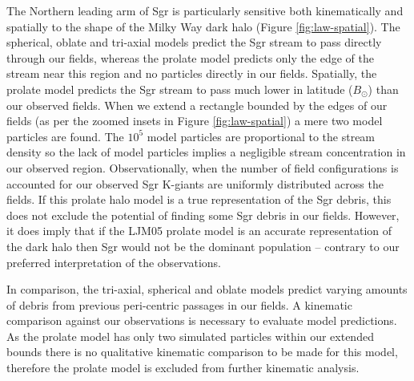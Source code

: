 \documentclass[preprint2]{aastex}
\begin{document}
	The Northern leading arm of Sgr is particularly sensitive both kinematically and spatially to the shape of the Milky Way dark halo (Figure \ref{fig:law-spatial}). The spherical, oblate and tri-axial models predict the Sgr stream to pass directly through our fields, whereas the prolate model predicts only the edge of the stream near this region and no particles directly in our fields. Spatially, the prolate model predicts the Sgr stream to pass much lower in latitude ($B_\odot$) than our observed fields. When we extend a rectangle bounded by the edges of our fields (as per the zoomed insets in Figure \ref{fig:law-spatial}) a mere two model particles are found. The $10^5$ model particles are proportional to the stream density so the lack of model particles implies a negligible stream concentration in our observed region. Observationally, when the number of field configurations is accounted for our observed Sgr K-giants are uniformly distributed across the fields. If this prolate halo model is a true representation of the Sgr debris, this does not exclude the potential of finding some Sgr debris in our fields. However, it does imply that if the LJM05 prolate model is an accurate representation of the dark halo then Sgr would not be the dominant population \--- contrary to our preferred interpretation of the observations.
	
	In comparison, the tri-axial, spherical and oblate models predict varying amounts of debris from previous peri-centric passages in our fields. A kinematic comparison against our observations is necessary to evaluate model predictions. As the prolate model has only two simulated particles within our extended bounds there is no qualitative kinematic comparison to be made for this model, therefore the prolate model is excluded from further kinematic analysis.
\end{document}
